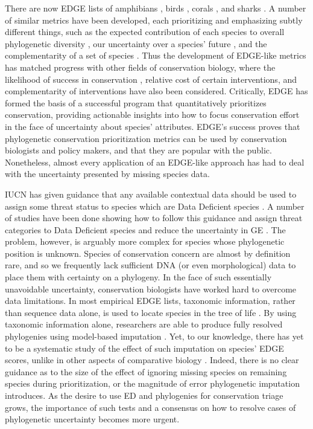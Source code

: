 \documentclass[12pt,english]{article}
\begin{document}
There are now EDGE lists of amphibians \autocite{Isaac2012}, birds 
\autocite{Jetz2014}, corals \autocite{Curnick2015}, and sharks
\autocite{Stein2018}. A number of similar metrics  have been developed, each
prioritizing and emphasizing subtly different things, such as the expected
contribution of each species to overall phylogenetic diversity
\autocite[HEDGE;][]{Steel2007}, our uncertainty over a species' future
\autocite[EDAM;][]{Pearse2015}, and the complementarity of a set of species
\autocite{Faith2008,Jensen2016}. Thus the development of EDGE-like metrics has
matched progress with other fields of conservation biology, where the likelihood
of success in conservation \autocite{Wilson2007, Mcbride2007}, relative cost of
certain interventions\autocite{Naidoo2006}, and complementarity of
interventions \autocite{Pressey1993, Myers2000} have also been considered.
Critically, EDGE has formed the basis of a successful program that
quantitatively prioritizes conservation, providing actionable insights into how
to focus conservation effort in the face of uncertainty about species'
attributes. EDGE's success proves that phylogenetic conservation prioritization
metrics can be used by conservation biologists and policy makers, and that they
are popular with the public. Nonetheless, almost every application of an
EDGE-like approach has had to deal with the uncertainty presented by missing
species data.

IUCN has given guidance that any available contextual data should be used to
assign some threat status to species which are Data Deficient species
\autocite{Iucn2001, Iucn2008}. A number of studies have been done showing how to
follow this guidance and assign threat categories to Data Deficient species and
reduce the uncertainty in GE \autocite{Good2006, Butchart2010, Morais2013}. The
problem, however, is arguably more complex for species whose phylogenetic
position is unknown. Species of conservation concern are almost by definition
rare, and so we frequently lack sufficient DNA (or even morphological) data to
place them with certainty on a phylogeny. In the face of such essentially
unavoidable uncertainty, conservation biologists have worked hard to overcome
data limitations. In most empirical EDGE lists, taxonomic information, rather
than sequence data alone, is used to locate species in the tree of life
\autocite{Isaac2007, Isaac2012, Collen2011, Jetz2014, Curnick2015, Stein2018,
Gumbs2017}. By using taxonomic information alone, researchers are able to
produce fully resolved phylogenies using model-based imputation
\autocite{Kuhn2011, Thomas2013}. Yet, to our knowledge, there has yet to be a
systematic study of the effect of such imputation on species' EDGE scores,
unlike in other aspects of comparative biology \autocite{Rabosky2014}. Indeed,
there is no clear guidance as to the size of the effect of ignoring missing
species on remaining species during prioritization, or the magnitude of error
phylogenetic imputation introduces. As the desire to use ED and phylogenies for
conservation triage grows, the importance of such tests and a consensus on how
to resolve cases of phylogenetic uncertainty becomes more urgent.
\end{document}
